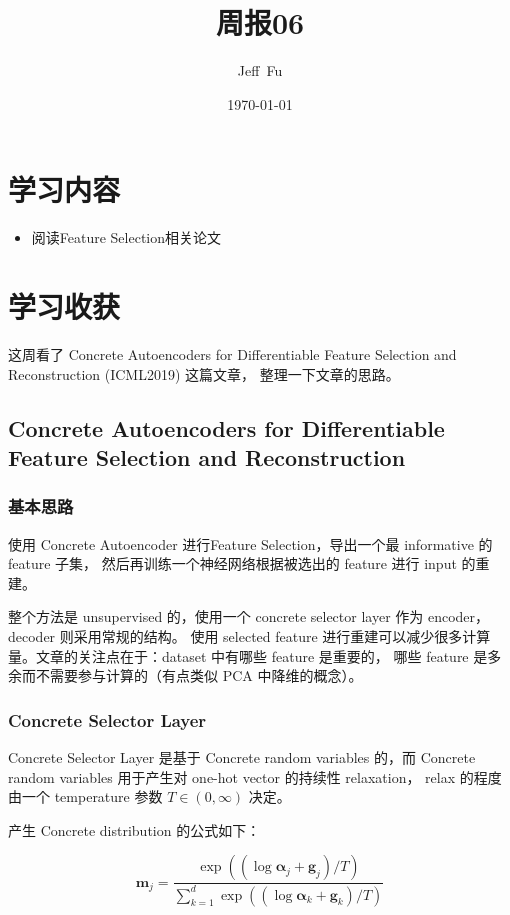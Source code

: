 \documentclass[UTF8]{ctexart}
\title{周报06}
\author{Jeff\ Fu}
\date{\today}
\begin{document}
    \maketitle
    \section{学习内容}
        \begin{itemize}
            \item 阅读Feature Selection相关论文
        \end{itemize}
    \section{学习收获}
        这周看了 Concrete Autoencoders for Differentiable Feature Selection and Reconstruction (ICML2019) 这篇文章，
        整理一下文章的思路。
        \subsection{Concrete Autoencoders for Differentiable Feature Selection and Reconstruction}
            \subsubsection{基本思路}
                使用 Concrete Autoencoder 进行Feature Selection，导出一个最 informative 的 feature 子集，
                然后再训练一个神经网络根据被选出的 feature 进行 input 的重建。

                整个方法是 unsupervised 的，使用一个 concrete selector layer 作为 encoder，decoder 则采用常规的结构。
                使用 selected feature 进行重建可以减少很多计算量。文章的关注点在于：dataset 中有哪些 feature 是重要的，
                哪些 feature 是多余而不需要参与计算的（有点类似 PCA 中降维的概念）。
            \subsubsection{Concrete Selector Layer}
                Concrete Selector Layer 是基于 Concrete random variables 的，而 Concrete random variables 用于产生对 one-hot vector 的持续性 relaxation，
                relax 的程度由一个 temperature 参数 $T \in (0, \infty)$ 决定。

                产生 Concrete distribution 的公式如下：

                $$
                    \mathbf{m}_j = \frac{\exp((\log \mathbf{\alpha}_j + \mathbf{g}_j)/T)}{\sum_{k=1}^d \exp((\log \mathbf{\alpha}_k + \mathbf{g}_k)/T)}
                $$
\end{document}
